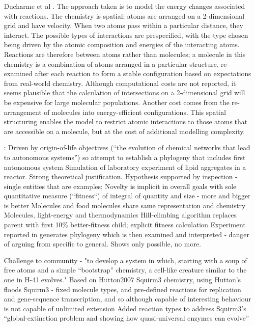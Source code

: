 Ducharme et al \parencite{Ducharme2012}. The approach taken is to model the energy changes associated with reactions. The chemistry is spatial; atoms are arranged on a 2-dimensional grid and have velocity. When two atoms pass within a particular distance, they interact. The possible types of interactions are prespecified, with the type chosen being driven by the atomic composition and energies of the interacting atoms. Reactions are therefore between atoms rather than molecules; a molecule in this chemistry is a combination of atoms arranged in a particular structure, re-examined after each reaction to form a stable configuration based on expectations from real-world chemistry. Although computational costs are not reported, it seems plausible that the calculation of intersections on a 2-dimensional grid will be expensive for large molecular populations. Another cost comes from the re-arrangement of molecules into energy-efficient configurations. This spatial structuring enables the model to restrict atomic interactions to those atoms that are accessible on a molecule, but at the cost of additional modelling complexity. 

\cite{Fernando:2008xy,Fernando:2007pf}:
Driven by origin-of-life objectives (``the evolution of chemical networks that lead to autonomous systems'') so attempt to establish a phylogeny that includes first autonomous system
Simulation of laboratory experiment of lipid aggregates in a reactor. Strong theoretical justification. Hypothesis supported by inspection - single entities that are examples; Novelty is implicit in overall goals with sole quantitative measure (``fitness``) of integral of quantity and size - more and bigger is better
Molecules and food molecules share same representation and chemistry
Molecules, light-energy and thermodynamics
Hill-climbing algorithm replaces parent with first 10\% better-fitness child; explicit fitness calculation
Experiment reported in \textcite{Fernando:2008xy} generates phylogeny which is then examined and interpreted - danger of arguing from specific to general. Shows only possible, no more.

\parencite{Lucht2012}

Challenge to community - "to develop a system in which, starting with a soup of free atoms and a simple ``bootstrap'' chemistry, a cell-like creature similar to the one in H-41 evolves."
Based on Hutton2007 Squirm3 chemistry, using Hutton's floods 
Squirm3 - fixed molecule types, and pre-defined reactions for replication and gene-sequence transcription, and so although capable of interesting behaviour is not capable of unlimited extension
Added reaction types to address Squirm3's ``global-extinction problem and showing how quasi-universal enzymes can evolve''

